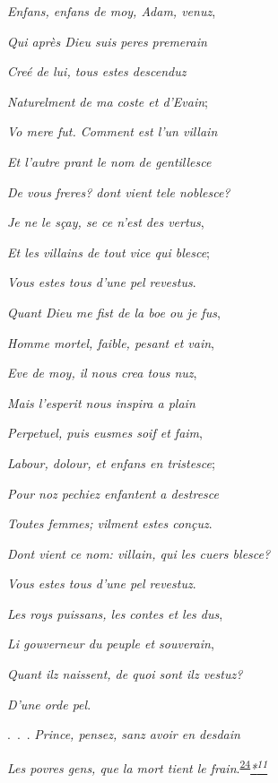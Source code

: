 \emph{Enfans, enfans de moy, Adam, venuz},

\emph{Qui après Dieu suis peres premerain}

\emph{Creé de lui, tous estes descenduz}

\emph{Naturelment de ma coste et d'Evain};

\emph{Vo mere fut. Comment est l'un villain}

\emph{Et l'autre prant le nom de gentillesce}

\emph{\protect\hypertarget{10_Chapter_Three__THE_HEROIC_DREAM.xhtmlux5cux23page_69}{}{}De
vous freres? dont vient tele noblesce?}

\emph{Je ne le sçay, se ce n'est des vertus},

\emph{Et les villains de tout vice qui blesce};

\emph{Vous estes tous d'une pel revestus}.

\emph{Quant Dieu me fist de la boe ou je fus},

\emph{Homme mortel, faible, pesant et vain},

\emph{Eve de moy, il nous crea tous nuz},

\emph{Mais l'esperit nous inspira a plain}

\emph{Perpetuel, puis eusmes soif et faim},

\emph{Labour, dolour, et enfans en tristesce};

\emph{Pour noz pechiez enfantent a destresce}

\emph{Toutes femmes; vilment estes conçuz}.

\emph{Dont vient ce nom: villain, qui les cuers blesce?}

\emph{Vous estes tous d'une pel revestuz}.

\emph{Les roys puissans, les contes et les dus},

\emph{Li gouverneur du peuple et souverain},

\emph{Quant ilz naissent, de quoi sont ilz vestuz?}

\emph{D'une orde pel}.

.~.~. \emph{Prince, pensez, sanz avoir en desdain}

\emph{Les povres gens, que la mort tient le
frain}.\textsuperscript{\protect\hypertarget{10_Chapter_Three__THE_HEROIC_DREAM.xhtmlux5cux23id_1884}{\protect\hyperlink{23_NOTES.xhtmlux5cux23id_1885}{24}}}\emph{\protect\hypertarget{10_Chapter_Three__THE_HEROIC_DREAM.xhtmlux5cux23id_2483}{\protect\hyperlink{23_NOTES.xhtmlux5cux23id_2484}{*\textsuperscript{11}}}}


